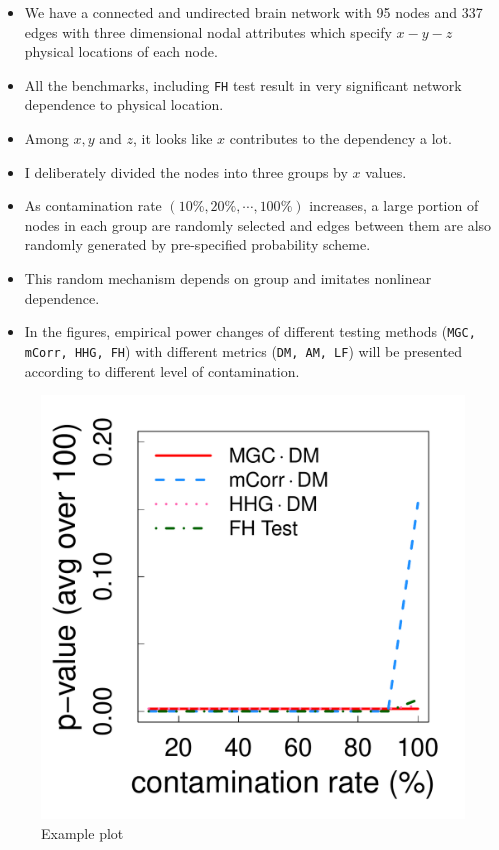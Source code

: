 \documentclass[11pt]{article}
\theoremstyle{definition}
\begin{document}
\begin{itemize}
\item We have a connected and undirected brain network with 95 nodes and 337 edges with three dimensional nodal attributes which specify $x-y-z$ physical locations of each node.
\item All the benchmarks, including \texttt{FH} test result in very significant network dependence to physical location. 
\item Among $x,y$ and $z$, it looks like $x$ contributes to the dependency a lot.
\item I deliberately divided the nodes into three groups by $x$ values.
\item As contamination rate $(10\%, 20\%, \cdots, 100\%)$ increases,  a large portion of nodes in each group are randomly selected and edges between them are also randomly generated by pre-specified probability scheme.
\item This random mechanism depends on group and imitates nonlinear dependence. 
\item In the figures, empirical power changes of different testing methods (\texttt{MGC, mCorr, HHG, FH}) with different metrics (\texttt{DM, AM, LF}) will be presented according to different level of contamination.
\end{itemize}


\begin{figure}[ht]
	\centering
	\includegraphics[width=0.7\linewidth]{MRIExp.pdf}
	\caption{Example plot}
\end{figure}
\end{document}
